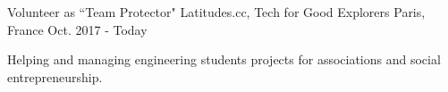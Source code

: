 \begin{cventries}
  \cventry
    {Volunteer as ``Team Protector"}
    {Latitudes.cc, Tech for Good Explorers}
    {Paris, France}
    {Oct. 2017 - Today}
    {
      \begin{cvitems}
        \item {Helping and managing engineering students projects for associations and social entrepreneurship.}
      \end{cvitems}
    }
\end{cventries}
